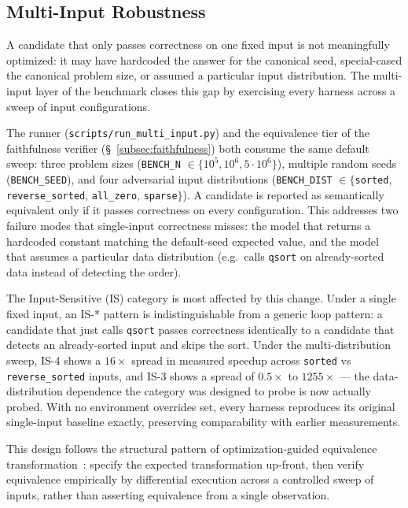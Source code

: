\subsection{Multi-Input Robustness}\label{subsec:multiinput}

A candidate that only passes correctness on one fixed input is not meaningfully optimized: it may have hardcoded the answer for the canonical seed, special-cased the canonical problem size, or assumed a particular input distribution. The multi-input layer of the benchmark closes this gap by exercising every harness across a sweep of input configurations.

The runner (\texttt{scripts/run\_multi\_input.py}) and the equivalence tier of the faithfulness verifier (\S~\ref{subsec:faithfulness}) both consume the same default sweep: three problem sizes (\texttt{BENCH\_N} $\in \{10^5, 10^6, 5 \cdot 10^6\}$), multiple random seeds (\texttt{BENCH\_SEED}), and four adversarial input distributions (\texttt{BENCH\_DIST} $\in \{$\texttt{sorted}, \texttt{reverse\_sorted}, \texttt{all\_zero}, \texttt{sparse}$\}$). A candidate is reported as semantically equivalent only if it passes correctness on every configuration. This addresses two failure modes that single-input correctness misses: the model that returns a hardcoded constant matching the default-seed expected value, and the model that assumes a particular data distribution (e.g.\ calls \texttt{qsort} on already-sorted data instead of detecting the order).

The Input-Sensitive (IS) category is most affected by this change. Under a single fixed input, an IS-* pattern is indistinguishable from a generic loop pattern: a candidate that just calls \texttt{qsort} passes correctness identically to a candidate that detects an already-sorted input and skips the sort. Under the multi-distribution sweep, IS-4 shows a $16\times$ spread in measured speedup across \texttt{sorted} vs \texttt{reverse\_sorted} inputs, and IS-3 shows a spread of $0.5\times$ to $1255\times$ — the data-distribution dependence the category was designed to probe is now actually probed. With no environment overrides set, every harness reproduces its original single-input baseline exactly, preserving comparability with earlier measurements.

This design follows the structural pattern of optimization-guided equivalence transformation~\cite{wu2025fse}: specify the expected transformation up-front, then verify equivalence empirically by differential execution across a controlled sweep of inputs, rather than asserting equivalence from a single observation.

